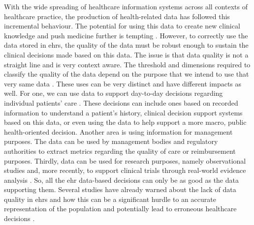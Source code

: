 With the wide spreading of healthcare information systems across all contexts of healthcare practice, the production of health-related data has followed this incremental behaviour. The potential for using this data to create new clinical knowledge and push medicine further is tempting \cite{martin-sanchezBigDataMedicine2014}.
However, to correctly use the data stored in \acp{ehr}, the quality of the data must be robust enough to sustain the clinical decisions made based on this data. The issue is that data quality is not a straight line and is very context aware. The threshold and dimensions required to classify the quality of the data depend on the purpose that we intend to use that very same data \cite{waljiElectronicHealthRecords2019}. These uses can be very distinct and have different impacts as well. For one, we can use data to support day-to-day decisions regarding individual patients' care \cite{verheijPossibleSourcesBias2018}. These decisions can include ones based on recorded information to understand a patient's history, clinical decision support systems based on this data, or even using the data to help support a more macro, public health-oriented decision. Another area is using information for management purposes. The data can be used by management bodies and regulatory authorities to extract metrics regarding the quality of care or reimbursement purposes. Thirdly, data can be used for research purposes, namely observational studies and, more recently, to support clinical trials through real-world evidence analysis \cite{coreyAssessingQualitySurgical2020,verheijPossibleSourcesBias2018,wengClinicalDataQuality2020}. 
So, all the \ac{ehr} data-based decisions can only be as good as the data supporting them. Several studies have already warned about the lack of data quality in \acp{ehr} and how this can be a significant hurdle to an accurate representation of the population and potentially lead to erroneous healthcare decisions \cite{reimerDataQualityAssessment2016a,joukesImpactElectronicPaperBased2019a,huserMultisiteEvaluationData2016,zhangUnderstandingDetectingDefects2020,kramerImpactDataQuality2021,gigantiImpactDataQuality2019}.

